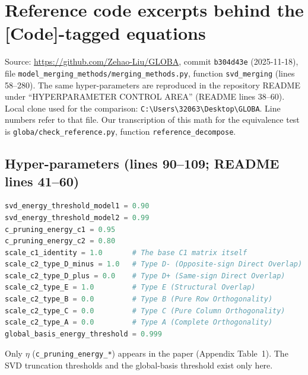 \documentclass[11pt,a4paper]{article}
\newcommand{\code}[1]{\texttt{#1}}
\begin{document}
\appendix
\section{Reference code excerpts behind the [Code]-tagged equations}
\label{app:code}
Source: \url{https://github.com/Zehao-Liu/GLOBA}, commit \code{b304d43e} (2025-11-18), file \code{model\_merging\_methods/merging\_methods.py}, function \code{svd\_merging} (lines 58--280). The same hyper-parameters are reproduced in the repository README under ``HYPERPARAMETER CONTROL AREA'' (README lines 38--60). Local clone used for the comparison: \code{C:\textbackslash Users\textbackslash 32063\textbackslash Desktop\textbackslash GLOBA}. Line numbers refer to that file. Our transcription of this math for the equivalence test is \code{globa/check\_reference.py}, function \code{reference\_decompose}.

\subsection*{Hyper-parameters (lines 90--109; README lines 41--60)}
\begin{lstlisting}[language=Python]
svd_energy_threshold_model1 = 0.90
svd_energy_threshold_model2 = 0.99
c_pruning_energy_c1 = 0.95
c_pruning_energy_c2 = 0.80
scale_c1_identity = 1.0       # The base C1 matrix itself
scale_c2_type_D_minus = 1.0   # Type D- (Opposite-sign Direct Overlap)
scale_c2_type_D_plus = 0.0    # Type D+ (Same-sign Direct Overlap)
scale_c2_type_E = 1.0         # Type E (Structural Overlap)
scale_c2_type_B = 0.0         # Type B (Pure Row Orthogonality)
scale_c2_type_C = 0.0         # Type C (Pure Column Orthogonality)
scale_c2_type_A = 0.0         # Type A (Complete Orthogonality)
global_basis_energy_threshold = 0.999
\end{lstlisting}
Only $\eta$ (\code{c\_pruning\_energy\_*}) appears in the paper (Appendix Table~1). The SVD truncation thresholds and the global-basis threshold exist only here.
\end{document}
